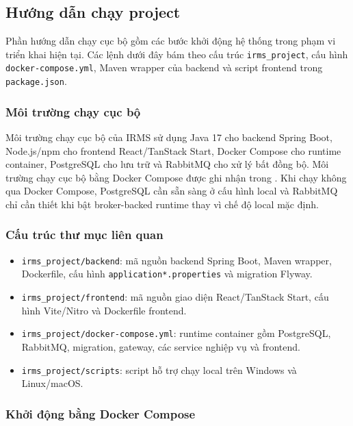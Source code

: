 \subsection{Hướng dẫn chạy project}\label{appendix:run-guide}

Phần hướng dẫn chạy cục bộ gồm các bước khởi động hệ thống trong phạm vi triển khai hiện tại. Các lệnh dưới đây bám theo cấu trúc \texttt{irms\_project}, cấu hình \texttt{docker-compose.yml}, Maven wrapper của backend và script frontend trong \texttt{package.json}.

\subsubsection*{Môi trường chạy cục bộ}

Môi trường chạy cục bộ của IRMS sử dụng Java 17 cho backend \textsf{Spring Boot}, Node.js/npm cho frontend React/TanStack Start, \textsf{Docker Compose} cho runtime container, \textsf{PostgreSQL} cho lưu trữ và \textsf{RabbitMQ} cho xử lý bất đồng bộ. Môi trường chạy cục bộ bằng Docker Compose được ghi nhận trong . Khi chạy không qua Docker Compose, PostgreSQL cần sẵn sàng ở cấu hình local và RabbitMQ chỉ cần thiết khi bật broker-backed runtime thay vì chế độ local mặc định.

\subsubsection*{Cấu trúc thư mục liên quan}

\begin{itemize}
  \item \texttt{irms\_project/backend}: mã nguồn backend \textsf{Spring Boot}, Maven wrapper, Dockerfile, cấu hình \texttt{application*.properties} và migration Flyway.
  \item \texttt{irms\_project/frontend}: mã nguồn giao diện React/TanStack Start, cấu hình Vite/Nitro và Dockerfile frontend.
  \item \texttt{irms\_project/docker-compose.yml}: runtime container gồm PostgreSQL, RabbitMQ, migration, gateway, các service nghiệp vụ và frontend.
  \item \texttt{irms\_project/scripts}: script hỗ trợ chạy local trên Windows và Linux/macOS.
\end{itemize}

\subsubsection*{Khởi động bằng Docker Compose}

